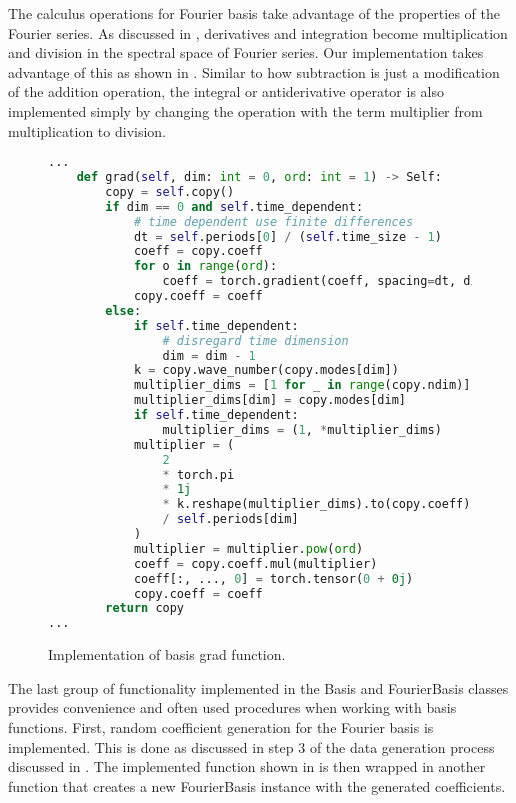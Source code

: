 The calculus operations for Fourier basis take advantage of the properties of the Fourier series. As discussed in , derivatives and integration become multiplication and division in the spectral space of Fourier series. Our implementation takes advantage of this as shown in . Similar to how subtraction is just a modification of the addition operation, the integral or antiderivative operator is also implemented simply by changing the operation with the term multiplier from multiplication to division. %

\begin{figure}[H]
  \centering
  \begin{lstlisting}[language=Python]
...
    def grad(self, dim: int = 0, ord: int = 1) -> Self:
        copy = self.copy()
        if dim == 0 and self.time_dependent:
            # time dependent use finite differences
            dt = self.periods[0] / (self.time_size - 1)
            coeff = copy.coeff
            for o in range(ord):
                coeff = torch.gradient(coeff, spacing=dt, dim=1)[0]
            copy.coeff = coeff
        else:
            if self.time_dependent:
                # disregard time dimension
                dim = dim - 1
            k = copy.wave_number(copy.modes[dim])
            multiplier_dims = [1 for _ in range(copy.ndim)]
            multiplier_dims[dim] = copy.modes[dim]
            if self.time_dependent:
                multiplier_dims = (1, *multiplier_dims)
            multiplier = (
                2
                * torch.pi
                * 1j
                * k.reshape(multiplier_dims).to(copy.coeff)
                / self.periods[dim]
            )
            multiplier = multiplier.pow(ord)
            coeff = copy.coeff.mul(multiplier)
            coeff[:, ..., 0] = torch.tensor(0 + 0j)
            copy.coeff = coeff
        return copy
...
  \end{lstlisting}
  \caption{Implementation of basis grad function.}\label{fig:basis_grad_impl}
\end{figure}

The last group of functionality implemented in the Basis and FourierBasis classes provides convenience and often used procedures when working with basis functions. First, random coefficient generation for the Fourier basis is implemented. This is done as discussed in step 3 of the data generation process discussed in . The implemented function shown in  is then wrapped in another function that creates a new FourierBasis instance with the generated coefficients.

